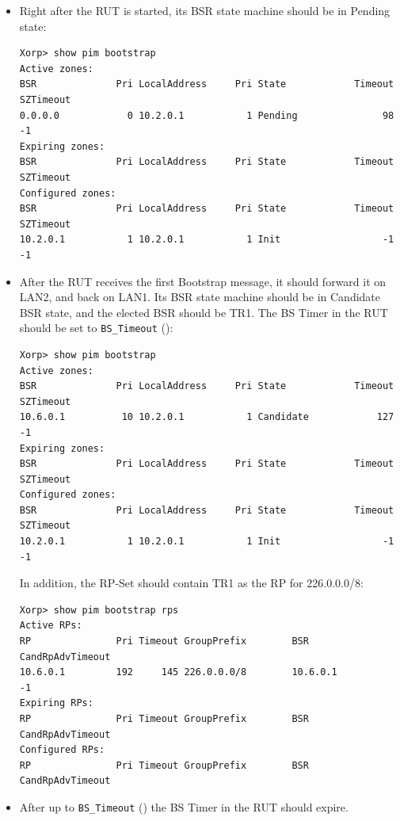 \documentclass[11pt]{report}
\begin{document}

\begin{itemize}

  \item Right after the RUT is started, its BSR state machine should be in
  Pending state:

\begin{verbatim}
Xorp> show pim bootstrap 
Active zones:
BSR              Pri LocalAddress     Pri State            Timeout SZTimeout
0.0.0.0            0 10.2.0.1           1 Pending               98        -1
Expiring zones:
BSR              Pri LocalAddress     Pri State            Timeout SZTimeout
Configured zones:
BSR              Pri LocalAddress     Pri State            Timeout SZTimeout
10.2.0.1           1 10.2.0.1           1 Init                  -1        -1
\end{verbatim}

  \item After the RUT receives the first Bootstrap message, it should forward
        it on LAN2, and back on LAN1. Its BSR state machine
        should be in Candidate BSR state, and the elected BSR should be TR1.
        The BS Timer in the RUT should be set to \verb=BS_Timeout=
        ({\PimsmBSTimeout}):

\begin{verbatim}
Xorp> show pim bootstrap 
Active zones:
BSR              Pri LocalAddress     Pri State            Timeout SZTimeout
10.6.0.1          10 10.2.0.1           1 Candidate            127        -1
Expiring zones:
BSR              Pri LocalAddress     Pri State            Timeout SZTimeout
Configured zones:
BSR              Pri LocalAddress     Pri State            Timeout SZTimeout
10.2.0.1           1 10.2.0.1           1 Init                  -1        -1
\end{verbatim}

  In addition, the RP-Set should contain TR1 as the RP for 226.0.0.0/8:

\begin{verbatim}
Xorp> show pim bootstrap rps 
Active RPs:
RP               Pri Timeout GroupPrefix        BSR         CandRpAdvTimeout
10.6.0.1         192     145 226.0.0.0/8        10.6.0.1                  -1
Expiring RPs:
RP               Pri Timeout GroupPrefix        BSR         CandRpAdvTimeout
Configured RPs:
RP               Pri Timeout GroupPrefix        BSR         CandRpAdvTimeout
\end{verbatim}

  \item After up to \verb=BS_Timeout= ({\PimsmBSTimeout}) the BS Timer in the
  RUT should expire.


\end{itemize}
\end{document}
